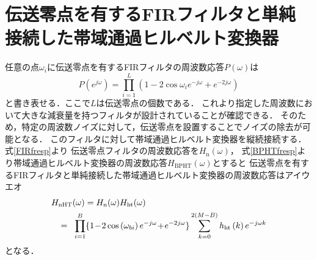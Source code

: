 \section{伝送零点を有するFIRフィルタと単純接続した帯域通過ヒルベルト変換器}
任意の点$\omega_{i}$に伝送零点を有するFIRフィルタの周波数応答$P(\omega)$は
\begin{equation}
  P(e^{j{\omega}})=\prod_{i=1}^L{(1-2\cos{\omega_{i}}e^{-j{\omega}}+e^{-2j{\omega}})}
\end{equation}
と書き表せる．ここで$L$は伝送零点の個数である．
これより指定した周波数において大きな減衰量を持つフィルタが設計されていることが確認できる．
そのため，特定の周波数ノイズに対して，伝送零点を設置することでノイズの除去が可能となる．
このフィルタに対して帯域通過ヒルベルト変換器を縦続接続する．式\eqref{FIRfresp}より
伝送零点フィルタの周波数応答を$H_{\mathrm{n}}(\omega)$，
式\eqref{BPHTfresp}より帯域通過ヒルベルト変換器の周波数応答$H_{\mathrm{BPHT}}(\omega)$とすると
伝送零点を有するFIRフィルタと単純接続した帯域通過ヒルベルト変換器の周波数応答はアイウエオ
\begin{eqnarray}
  \lefteqn{
H_{\mathrm{nHT}}(\omega)={H_{\mathrm{n}}(\omega)}{H_{\mathrm{ht}}(\omega)}}\quad\nonumber\\
&\!=\!& \prod_{i=1}^{B} \{1\!-\!2\cos\left(\omega_{bi}\right)e^{-j{\omega}}\!+\!e^{-2j{\omega}}\}\sum_{k=0}^{2(M-B)}{h_{\mathrm{ht}}}\left(k\right)e^{-j{\omega}k}
\end{eqnarray}
となる．